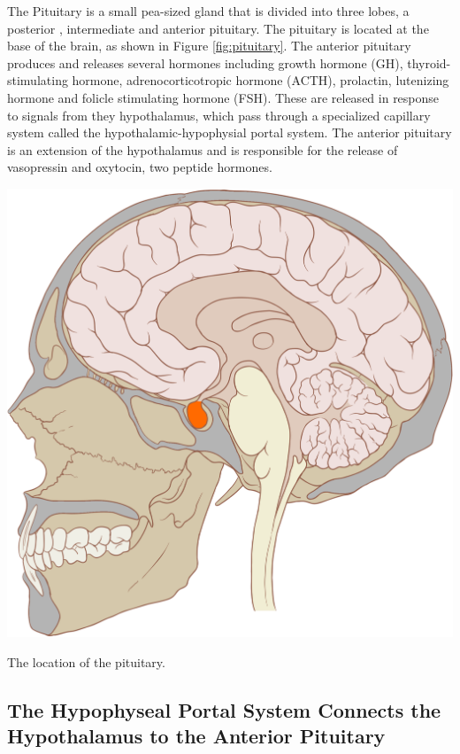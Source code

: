 \documentclass{tufte-handout}
\begin{document}
The Pituitary is a small pea-sized gland that is divided into three lobes, a posterior , intermediate and anterior pituitary.  The pituitary is located at the base of the brain, as shown in Figure \ref{fig:pituitary}.  The anterior pituitary produces and releases several hormones including growth hormone (GH), thyroid-stimulating hormone, adrenocorticotropic hormone (ACTH), prolactin, lutenizing hormone and folicle stimulating hormone (FSH).  These are released in response to signals from they hypothalamus, which pass through a specialized capillary system called the hypothalamic-hypophysial portal system.  The anterior pituitary is an extension of the hypothalamus and is responsible for the release of vasopressin and oxytocin, two peptide hormones. 

\begin{marginfigure}
  \includegraphics{figures/pituitary}
  \caption{The location of the pituitary.}
    \label{fig:pituitary}
\end{marginfigure}

\subsection{The Hypophyseal Portal System Connects the Hypothalamus to the Anterior Pituitary}
\end{document}
